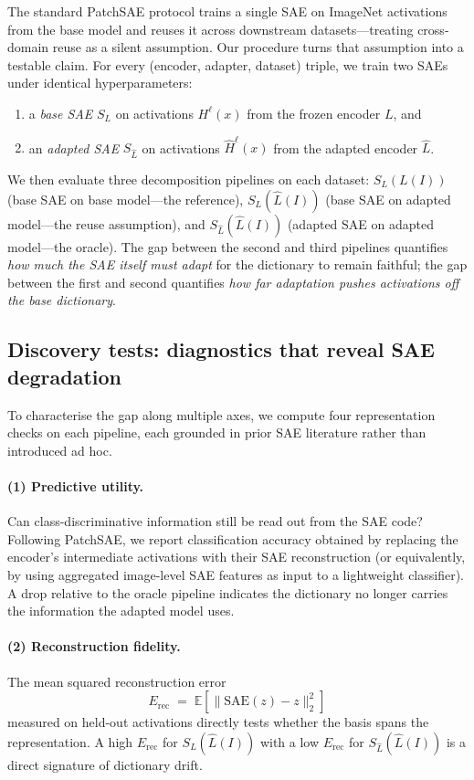 The standard PatchSAE protocol trains a single SAE on ImageNet activations
from the base model and reuses it across downstream datasets---treating
cross-domain reuse as a silent assumption. Our procedure turns that
assumption into a testable claim. For every (encoder, adapter, dataset)
triple, we train two SAEs under identical hyperparameters:
\begin{enumerate}
    \item a \emph{base SAE} $S_L$ on activations $H^{\ell}(x)$ from the
          frozen encoder $L$, and
    \item an \emph{adapted SAE} $S_{\hat{L}}$ on activations
          $\hat{H}^{\ell}(x)$ from the adapted encoder $\hat{L}$.
\end{enumerate}
We then evaluate three decomposition pipelines on each dataset:
$S_L(L(I))$ (base SAE on base model---the reference),
$S_L(\hat{L}(I))$ (base SAE on adapted model---the reuse assumption), and
$S_{\hat{L}}(\hat{L}(I))$ (adapted SAE on adapted model---the oracle). The
gap between the second and third pipelines quantifies \emph{how much the
SAE itself must adapt} for the dictionary to remain faithful; the gap
between the first and second quantifies \emph{how far adaptation pushes
activations off the base dictionary}.

\subsection{Discovery tests: diagnostics that reveal SAE degradation}
\label{sec:method-tests}

To characterise the gap along multiple axes, we compute four representation
checks on each pipeline, each grounded in prior SAE literature rather than
introduced ad hoc.

\paragraph{(1) Predictive utility.}
Can class-discriminative information still be read out from the SAE code?
Following PatchSAE, we report classification accuracy obtained by replacing
the encoder's intermediate activations with their SAE reconstruction (or
equivalently, by using aggregated image-level SAE features as input to a
lightweight classifier). A drop relative to the oracle pipeline indicates
the dictionary no longer carries the information the adapted model uses.

\paragraph{(2) Reconstruction fidelity.}
The mean squared reconstruction error
\begin{equation}
E_{\mathrm{rec}} \;=\; \mathbb{E}\!\left[\|\mathrm{SAE}(z) - z\|_2^2\right]
\label{eq:recon-error}
\end{equation}
measured on held-out activations directly tests whether the basis spans the
representation. A high $E_{\mathrm{rec}}$ for $S_L(\hat{L}(I))$ with a low
$E_{\mathrm{rec}}$ for $S_{\hat{L}}(\hat{L}(I))$ is a direct signature of
dictionary drift.

